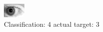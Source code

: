 \begin{figure}[h!]
\begin{center}
\includegraphics[width=0.60\columnwidth]{figures/ID336_class_4_target_3.png}
\end{center}
\caption{ Classification: 4 actual target: 3}
\label{fig:ID336_class_4_target_3}
\end{figure}
